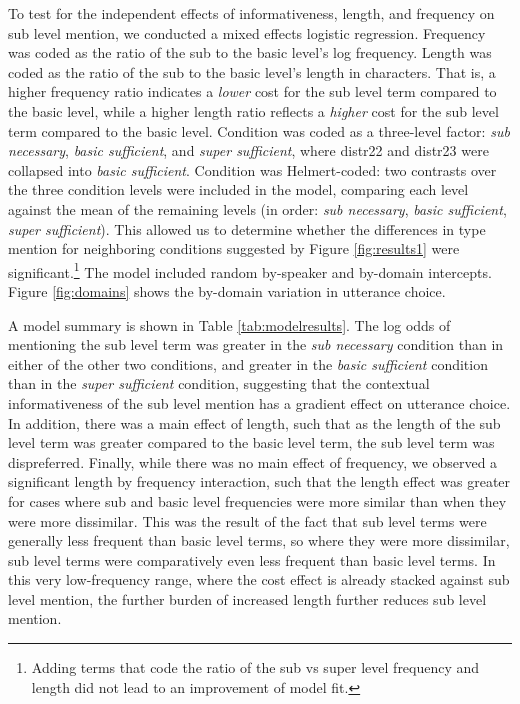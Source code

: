 \documentclass[10pt,letterpaper]{article}
\newcommand{\tableref}[1]{Table \ref{#1}}
\newcommand{\figref}[1]{Figure \ref{#1}}
\begin{document}
To test for the independent effects of informativeness, length, and frequency on sub level mention, we conducted a mixed effects logistic regression. Frequency was coded as the ratio of the sub to the basic level's log frequency. Length was coded as the ratio of the sub to the basic level's length in characters. That is, a higher frequency ratio indicates a \emph{lower} cost for the sub level term compared to the basic level, while a higher length ratio reflects a \emph{higher} cost for the sub level term compared to the basic level. Condition was coded as a three-level factor: \emph{sub necessary}, \emph{basic sufficient}, and \emph{super sufficient}, where distr22 and distr23 were collapsed into \emph{basic sufficient}. Condition was Helmert-coded: two contrasts over the three condition levels were included in the model, comparing each level against the mean of the remaining levels (in order: \emph{sub necessary}, \emph{basic sufficient}, \emph{super sufficient}). This allowed us to determine whether the differences in type mention  for neighboring conditions suggested by \figref{fig:results1} were significant.\footnote{Adding terms that code the ratio of the sub vs super level frequency and length did not lead to an improvement of model fit.} The model included random by-speaker and by-domain intercepts. \figref{fig:domains} shows the by-domain variation in utterance choice.

A model summary is shown in \tableref{tab:modelresults}. The log odds of mentioning the sub level term was greater in the \emph{sub necessary} condition than in either of the other two conditions, and greater in the \emph{basic sufficient} condition than in the \emph{super sufficient} condition, suggesting that the contextual informativeness of the sub level mention has a gradient effect on utterance choice. In addition, there was a main effect of length, such that as the length of the sub level term was greater compared to the basic level term, the sub level term was dispreferred. Finally, while there was no main effect of frequency, we observed a significant length by frequency interaction, such that the length effect was greater for cases where sub and basic level frequencies were more similar than when they were more dissimilar. This was the result of the fact that sub level terms were generally less frequent than basic level terms, so where they were more dissimilar, sub level terms were comparatively even less frequent than basic level terms. In this very low-frequency range, where the cost effect is already stacked against sub level mention, the further burden of increased length further reduces sub level mention.
\end{document}
